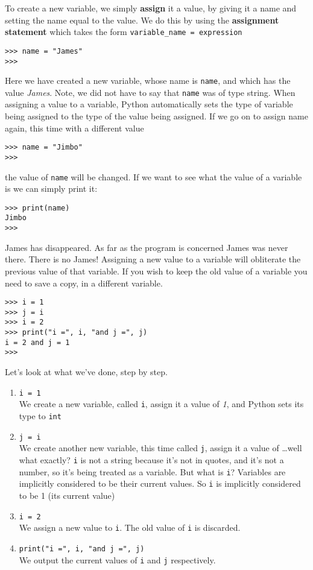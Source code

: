To create a new variable, we simply \textbf{assign}   it a value, by giving it a name and setting the name equal to the   value. We do this by using the \textbf{assignment statement}   which takes the form \texttt{variable\_name = expression}
\begin{lstlisting}
>>> name = "James"
>>>
\end{lstlisting}

Here we have created a new variable, whose name is \texttt{name}, and which   has the value \textit{James}. Note, we did not have to say that \texttt{name} was of type string.   When assigning a value to a variable, Python automatically sets the type of   variable being assigned to the type of the value being assigned. If we   go on to assign name again, this time with a different value
\begin{lstlisting}
>>> name = "Jimbo"
>>>
\end{lstlisting}

the value of \texttt{name} will be changed. If we want to see what the value of   a variable is we can simply print it:
\begin{lstlisting}
>>> print(name)
Jimbo
>>>
\end{lstlisting}

James has disappeared. As far as the program is concerned James was   never there. There is no James! Assigning a new value to a variable   will obliterate the previous value of that variable. If you wish to   keep the old value of a variable you need to save a copy, in a   different variable.
\begin{lstlisting}
>>> i = 1
>>> j = i
>>> i = 2
>>> print("i =", i, "and j =", j)
i = 2 and j = 1
>>>
\end{lstlisting}

Let's look at what we've done, step by step.
\begin{enumerate}
	\item 
\texttt{i = 1}
\\     We create a new variable, called \texttt{i}, assign it a value of    \textit{1}, and Python sets its type to \texttt{int}
	\item 
\texttt{j = i}
\\     We create another new variable, this time called \texttt{j}, assign it a    value of \ldots well what exactly? 
\texttt{i} is not a string    because it's not in quotes, and it's not a number, so it's being    treated as a variable. But what is \texttt{i}? Variables are implicitly    considered to be their current values. So 
\texttt{i} is    implicitly considered to be 1 (its current value)
	\item 
\texttt{i = 2}
\\     We assign a new value to \texttt{i}. The old value of \texttt{i} is    discarded.
	\item 
\texttt{print("i =", i, "and j =", j)}
\\     We output the current values of \texttt{i} and \texttt{j} respectively.
\end{enumerate}

